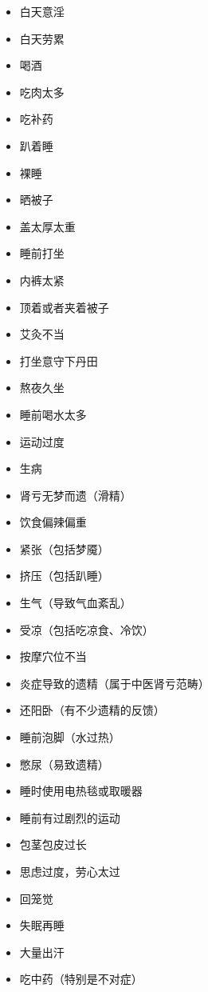\begin{multicols}{3}
    \begin{itemize}
        \item 白天意淫
        \item 白天劳累
        \item 喝酒
        \item 吃肉太多
        \item 吃补药
        \item 趴着睡
        \item 裸睡
        \item 晒被子
        \item 盖太厚太重
        \item 睡前打坐
        \item 内裤太紧
        \item 顶着或者夹着被子
        \item 艾灸不当
        \item 打坐意守下丹田
        \item 熬夜久坐
        \item 睡前喝水太多
        \item 运动过度
        \item 生病
        \item 肾亏无梦而遗（滑精）
        \item 饮食偏辣偏重
        \item 紧张（包括梦魇）
        \item 挤压（包括趴睡）
        \item 生气（导致气血紊乱）
        \item 受凉（包括吃凉食、冷饮）
        \item 按摩穴位不当
        \item 炎症导致的遗精（属于中医肾亏范畴）
        \item 还阳卧（有不少遗精的反馈）
        \item 睡前泡脚（水过热）
        \item 憋尿（易致遗精）
        \item 睡时使用电热毯或取暖器
        \item 睡前有过剧烈的运动
        \item 包茎包皮过长
        \item 思虑过度，劳心太过
        \item 回笼觉
        \item 失眠再睡
        \item 大量出汗
        \item 吃中药（特别是不对症）

\end{itemize}
\end{multicols}
